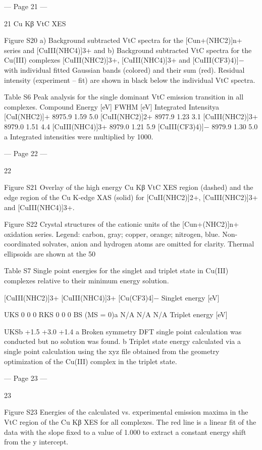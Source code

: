 --- Page 21 ---
 
21 
Cu Kβ VtC XES 
 
Figure S20 a) Background subtracted VtC spectra for the [Cun+(NHC2)]n+ series and [CuIII(NHC4)]3+ and b) 
Background subtracted VtC spectra for the Cu(III) complexes [CuIII(NHC2)]3+, [CuIII(NHC4)]3+ and [CuIII(CF3)4)]− 
with individual fitted Gaussian bands (colored) and their sum (red). Residual intensity (experiment – fit) are shown 
in black below the individual VtC spectra.  
 
Table S6 Peak analysis for the single dominant VtC emission transition in all complexes. 
Compound 
Energy [eV] 
FWHM [eV] 
Integrated Intensitya 
[CuI(NHC2)]+ 
8975.9 
1.59 
5.0 
[CuII(NHC2)]2+ 
8977.9 
1.23 
3.1 
[CuIII(NHC2)]3+ 
8979.0 
1.51 
4.4 
[CuIII(NHC4)]3+ 
8979.0 
1.21 
5.9 
[CuIII(CF3)4)]− 
8979.9 
1.30 
5.0 
a Integrated intensities were multiplied by 1000. 
  


--- Page 22 ---
 
22 
 
Figure S21 Overlay of the high energy Cu Kβ VtC XES region (dashed) and the edge region of the Cu K-edge 
XAS (solid) for [CuII(NHC2)]2+, [CuIII(NHC2)]3+ and [CuIII(NHC4)]3+. 
 
 
Figure S22 Crystal structures of the cationic units of the [Cun+(NHC2)]n+ oxidation series. Legend: carbon, gray; 
copper, orange; nitrogen, blue. Non-coordinated solvates, anion and hydrogen atoms are omitted for clarity. 
Thermal ellipsoids are shown at the 50%
 
Table S7 Single point energies for the singlet and triplet state in Cu(III) complexes relative to their minimum 
energy solution. 
 
[CuIII(NHC2)]3+ 
[CuIII(NHC4)]3+ 
[Cu(CF3)4]− 
Singlet energy [eV] 
 
 
 
UKS  
0 
0 
0 
RKS 
0 
0 
0 
BS (MS = 0)a 
N/A 
N/A 
N/A 
Triplet energy [eV] 
 
 
 
UKSb 
+1.5 
+3.0 
+1.4 
a Broken symmetry DFT single point calculation was conducted but no solution was found. b Triplet state energy 
calculated via a single point calculation using the xyz file obtained from the geometry optimization of the Cu(III) 
complex in the triplet state. 


--- Page 23 ---
 
23 
 
 
Figure S23 Energies of the calculated vs. experimental emission maxima in the VtC region of the Cu Kβ XES 
for all complexes. The red line is a linear fit of the data with the slope fixed to a value of 1.000 to extract a 
constant energy shift from the y intercept. 
 


